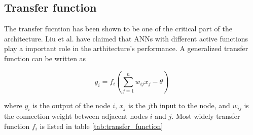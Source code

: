 \subsection{Transfer function}
The transfer fucntion has been shown to be one of the critical part of the
architecture. Liu \cite{liu1996evolutionary} et al. have claimed that ANNs with
different active functions play a important role in the arthitecture's performance.
A generalized transfer function can be written as

\begin{equation}
	y_i = f_i(\sum_{j=1}^n{w_{ij}x_j - \theta})
\end{equation}

where $y_i$ is the output of the node $i$, $x_j$ is the $j$th input to the node,
and $w_{ij}$ is the connection weight between adjacent nodes $i$ and $j$. Most
widely transfer function  $f_i$ is listed in table \ref{tab:transfer_function}












